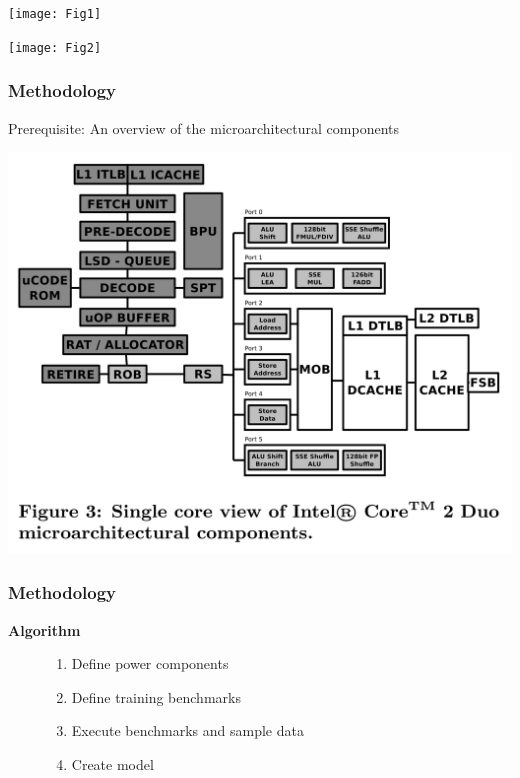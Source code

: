 \documentclass[screen]{beamer}
\begin{document}
\begin{frame}
    \texttt{[image: Fig1]}
\end{frame}

\begin{frame}
    \texttt{[image: Fig2]}
\end{frame}

\begin{frame}
    \frametitle{Methodology}
    Prerequisite: An overview of the microarchitectural components
\end{frame}

\begin{frame}
    \includegraphics{Fig3}
\end{frame}

\begin{frame}
    \frametitle{Methodology}
    \textbf{Algorithm}
    \begin{figure}
        \begin{enumerate}
            \item Define power components
            \item Define training benchmarks
            \item Execute benchmarks and sample data
            \item Create model
        \end{enumerate}
    \end{figure}

\end{frame}
\end{document}
